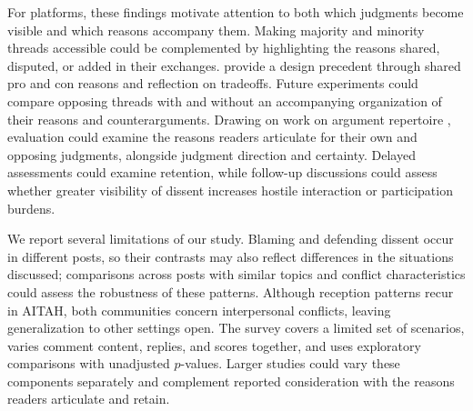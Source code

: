 For platforms, these findings motivate attention to both which judgments
become visible and which reasons accompany them. Making majority and
minority threads accessible could be complemented by highlighting the
reasons shared, disputed, or added in their exchanges.
\citet{kriplean2012considerit} provide a design precedent through shared
pro and con reasons and reflection on tradeoffs. Future experiments could
compare opposing threads with and without an accompanying organization of
their reasons and counterarguments. Drawing on work on argument repertoire
\cite{cappella2002argument,price2002disagreement}, evaluation could examine
the reasons readers articulate for their own and opposing judgments,
alongside judgment direction and certainty. Delayed assessments could
examine retention, while follow-up discussions could assess whether greater
visibility of dissent increases hostile interaction or participation burdens.

We report several limitations of our study. Blaming and defending dissent
occur in different posts, so their contrasts may also reflect differences
in the situations discussed; comparisons across posts with similar topics
and conflict characteristics could assess the robustness of these patterns.
Although reception patterns recur in AITAH, both communities concern
interpersonal conflicts, leaving generalization to other settings open.
The survey covers a limited set of scenarios, varies comment content,
replies, and scores together, and uses exploratory comparisons with
unadjusted $p$-values. Larger studies could vary these components separately
and complement reported consideration with the reasons readers articulate
and retain.

